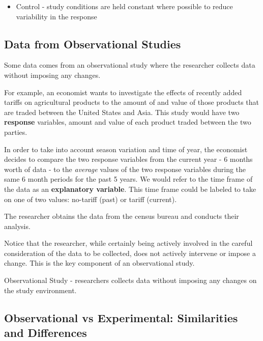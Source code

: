 \documentclass[
]{book}
\providecommand{\tightlist}{%
  \setlength{\itemsep}{0pt}\setlength{\parskip}{0pt}}
\theoremstyle{definition}
\theoremstyle{definition}
\theoremstyle{definition}
\theoremstyle{remark}
\let\BeginKnitrBlock\begin \let\EndKnitrBlock\end
\begin{document}
\BeginKnitrBlock{definition}
\begin{itemize}
\tightlist
\item
  Control - study conditions are held constant where possible to reduce variability in the response\\
\end{itemize}
\EndKnitrBlock{definition}

\hypertarget{data-from-observational-studies}{%
\subsection{Data from Observational Studies}\label{data-from-observational-studies}}

Some data comes from an observational study where the researcher collects data without imposing any changes.

For example, an economist wants to investigate the effects of recently added tariffs on agricultural products to the amount of and value of those products that are traded between the United States and Asia. This study would have two \textbf{response} variables, amount and value of each product traded between the two parties.

In order to take into account season variation and time of year, the economist decides to compare the two response variables from the current year - 6 months worth of data - to the \emph{average} values of the two response variables during the same 6 month periods for the past 5 years. We would refer to the time frame of the data as an \textbf{explanatory variable}. This time frame could be labeled to take on one of two values: no-tariff (past) or tariff (current).

The researcher obtains the data from the census bureau and conducts their analysis.

Notice that the researcher, while certainly being actively involved in the careful consideration of the data to be collected, does not actively intervene or impose a change. This is the key component of an observational study.

\BeginKnitrBlock{definition}
Observational Study - researchers collects data without imposing any changes on the study environment.
\EndKnitrBlock{definition}

\hypertarget{observational-vs-experimental-similarities-and-differences}{%
\subsection{Observational vs Experimental: Similarities and Differences}\label{observational-vs-experimental-similarities-and-differences}}
\end{document}
